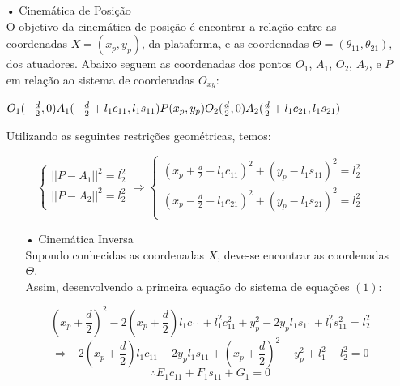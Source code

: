 \documentclass[12pt,a4paper]{article}
\begin{document}
\begin{itemize}
\item[•] Cinemática de Posição \\

	O objetivo da cinemática de posição é encontrar a relação entre as coordenadas $X = (x_p, y_p)$, da plataforma, e as coordenadas $\Theta = (\theta_{11}, \theta_{21})$, dos atuadores.
	Abaixo seguem as coordenadas dos pontos $O_1$, $A_1$, $O_2$, $A_2$, e $P$ em relação ao sistema de coordenadas $O_{xy}$:
	\begin{multicols}{2}
	$ O_1 (-\frac{d}{2}, 0) \\
	A_1 ( -\frac{d}{2} + l_1 c_{11} , l_1 s_{11} ) \\
	P (x_p, y_p) \\
	O_2 (\frac{d}{2}, 0) \\
	A_2 ( \frac{d}{2} + l_1 c_{21} , l_1 s_{21} ) $	
	\end{multicols}
	
	Utilizando as seguintes restrições geométricas, temos:
	
	\begin{equation}
		\begin{cases}
		|| P - A_1 ||^2 = l_2^2 \\
		|| P - A_2 ||^2 = l_2^2 \\
		\end{cases}
		\Rightarrow	
		\begin{cases}
		(x_p +\frac{d}{2} - l_1 c_{11})^2 + (y_p - l_1 s_{11})^2 = l_2^2 \\
		(x_p -\frac{d}{2} - l_1 c_{21})^2 + (y_p - l_1 s_{21})^2 = l_2^2 \\
		\end{cases}
	\end{equation}

		\begin{itemize}
		\item[•] Cinemática Inversa \\
	
		Supondo	conhecidas as coordenadas $X$, deve-se encontrar as coordenadas $\Theta$. \\
		Assim, desenvolvendo a primeira equação do sistema de equações $(1)$:
		
		$$ (x_p +\frac{d}{2})^2 -2 (x_p +\frac{d}{2}) l_1 c_{11} + l_1^2 c_{11}^2 + y_p^2 - 2 y_p l_1 s_{11} + l_1^2 s_{11}^2 = l_2^2   $$
		$$ \Rightarrow -2 (x_p +\frac{d}{2}) l_1 c_{11} - 2 y_p l_1 s_{11} +  (x_p +\frac{d}{2})^2 + y_p^2 + l_1^2 - l_2^2 = 0 $$
		\begin{equation}
		\therefore E_1 c_{11} + F_1 s_{11} + G_1 = 0
		\end{equation}
		

\end{itemize}
\end{itemize}
\end{document}
